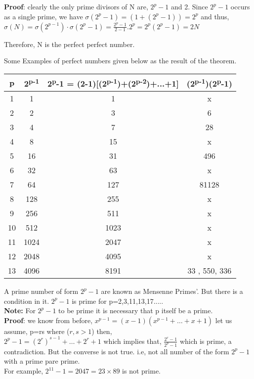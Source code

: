 \documentclass[12pt,,a4paper]{book}
\begin{document}
\textbf{Proof}: clearly the only prime divisors of N are, \(2^{p}-1\) and 2. Since \(2^{p}-1\) occurs as a single prime, we have \(\sigma(2^p-1) = (1 + (2^p-1)) = 2^p\) and thus, 
\(\sigma(N) = \sigma(2^{p-1}) \cdot \sigma(2^p-1) = \frac{{2^p - 1}}{{2-1}}\).\(2^p = 2^p (2^p-1) = 2N\)

Therefore, N is the perfect perfect number.

Some Examples of perfect numbers given below  as the result of the theorem.
\vspace{20pt}


\begin{tabular}{|c|c|c|c|}
\hline
\textbf{p} & \textbf{2\textsuperscript{p-1}} & \textbf{2\textsuperscript{p}-1 = (2-1)[(2\textsuperscript{p-1})+(2\textsuperscript{p-2})+...+1}] & \textbf{(2\textsuperscript{p-1})(2\textsuperscript{p}-1)} \\
\hline
1 & 1 & 1 & x \\
\hline
2 & 2 & 3 & 6 \\
\hline
3 & 4 & 7 & 28 \\
\hline
4 & 8 & 15 & x \\
\hline
5 & 16 & 31 & 496 \\
\hline
6 & 32 & 63 & x \\
\hline
7 & 64 & 127 & 81128 \\
\hline
8 & 128 & 255 & x \\
\hline
9 & 256 & 511 & x \\
\hline
10 & 512 & 1023 & x \\
\hline
11 & 1024 & 2047 & x \\
\hline
12 & 2048 & 4095 & x \\
\hline
13 & 4096 & 8191 & 33 , 550, 336 \\
\hline
\end{tabular}

\vspace{20pt}


 A prime number of form \(2^{p}-1\) are known as Mensenne Primes'. But there is a condition in it. \(2^{p}-1\) is prime for p=2,3,11,13,17.....\\
\textbf{Note:} For \(2^{p}-1\) to be prime it is necessary that p itself be a prime.\\
\textbf{Proof}: we know from before, $x^{p-1} = (x-1)(x^{p-1} + \ldots + x + 1)$ let us assume, p=rs where (\(r, s > 1\)) then, \\
 \(2^p-1 = (2^r)^{s-1}+\ldots+2^r+1\) which implies that, \(\frac{{2^r-1}}{{2^p-1}}\)  which is prime, a contradiction. But the converse is not true. i.e, not all number of the form \(2^{p}-1\) with a prime pare prime. \\
For example, \(2^{11}-1=2047=23 \times 89\) is not prime. \\
\end{document}
